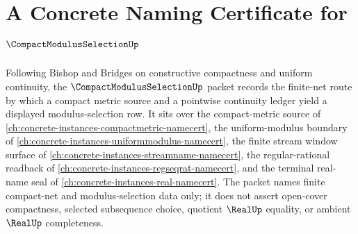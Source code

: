 \chapter{A Concrete Naming Certificate for $\CompactModulusSelectionUp$}
\label{ch:concrete-instances-compact-modulus-selection-namecert}

Following Bishop and Bridges on constructive compactness and uniform continuity, the $\CompactModulusSelectionUp$ packet records the finite-net route by which a compact metric source and a pointwise continuity ledger yield a displayed modulus-selection row. It sits over the compact-metric source of \autoref{ch:concrete-instances-compactmetric-namecert}, the uniform-modulus boundary of \autoref{ch:concrete-instances-uniformmodulus-namecert}, the finite stream window surface of \autoref{ch:concrete-instances-streamname-namecert}, the regular-rational readback of \autoref{ch:concrete-instances-regseqrat-namecert}, and the terminal real-name seal of \autoref{ch:concrete-instances-real-namecert}. The packet names finite compact-net and modulus-selection data only; it does not assert open-cover compactness, selected subsequence choice, quotient $\RealUp$ equality, or ambient $\RealUp$ completeness.

